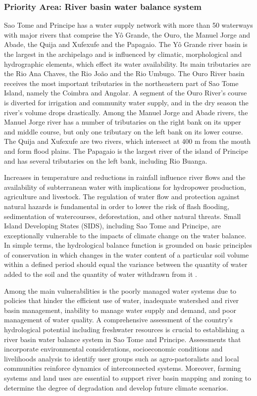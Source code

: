 \documentclass[
]{book}
\begin{document}
\hypertarget{priority-area-river-basin-water-balance-system}{%
\subsubsection{Priority Area: River basin water balance system}\label{priority-area-river-basin-water-balance-system}}

Sao Tome and Principe has a water supply network with more than 50 waterways with major rivers that comprise the Yô Grande, the Ouro, the Manuel Jorge and Abade, the Quija and Xufexufe and the Papagaio. The Yô Grande river basin is the largest in the archipelago and is influenced by climatic, morphological and hydrographic elements, which effect its water availability. Its main tributaries are the Rio Ana Chaves, the Rio João and the Rio Umbugo. The Ouro River basin receives the most important tributaries in the northeastern part of Sao Tome Island, namely the Coimbra and Angolar. A segment of the Ouro River's course is diverted for irrigation and community water supply, and in the dry season the river's volume drops drastically. Among the Manuel Jorge and Abade rivers, the Manuel Jorge river has a number of tributaries on the right bank on its upper and middle course, but only one tributary on the left bank on its lower course. The Quija and Xufexufe are two rivers, which intersect at 400 m from the mouth and form flood plains. The Papagaio is the largest river of the island of Principe and has several tributaries on the left bank, including Rio Buanga.

Increases in temperature and reductions in rainfall influence river flows and the availability of subterranean water with implications for hydropower production, agriculture and livestock. The regulation of water flow and protection against natural hazards is fundamental in order to lower the risk of flash flooding, sedimentation of watercourses, deforestation, and other natural threats. Small Island Developing States (SIDS), including Sao Tome and Principe, are exceptionally vulnerable to the impacts of climate change on the water balance. In simple terms, the hydrological balance function is grounded on basic principles of conservation in which changes in the water content of a particular soil volume within a defined period should equal the variance between the quantity of water added to the soil and the quantity of water withdrawn from it .

Among the main vulnerabilities is the poorly managed water systems due to policies that hinder the efficient use of water, inadequate watershed and river basin management, inability to manage water supply and demand, and poor management of water quality. A comprehensive assessment of the country's hydrological potential including freshwater resources is crucial to establishing a river basin water balance system in Sao Tome and Principe. Assessments that incorporate environmental considerations, socioeconomic conditions and livelihoods analysis to identify user groups such as agro-pastoralists and local communities reinforce dynamics of interconnected systems. Moreover, farming systems and land uses are essential to support river basin mapping and zoning to determine the degree of degradation and develop future climate scenarios.
\end{document}
